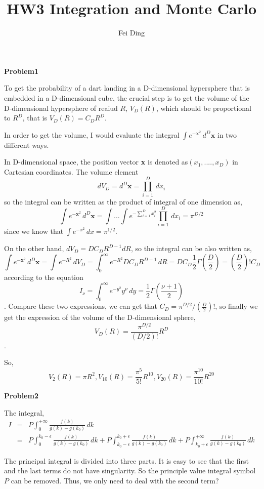\documentclass{article}
\title{HW3 Integration and Monte Carlo}
\author{Fei Ding}
\begin{document}
\maketitle

\textbf{Problem1}

To get the probability of a dart landing in a D-dimensional hypersphere that is embedded in a D-dimensional cube, the crucial step is to get the volume of the D-dimensional hypersphere of reaiud $R$, $V_D(R)$, which should be proportional to $R^D$, that is $V_D(R)=C_DR^D$. 

In order to get the volume, I would evaluate the integral $\int e^{-\textbf{x}^2}\,d^D\textbf{x}$ in two different ways.


In D-dimensional space, the position vector \textbf{x} is denoted as$(x_1,....,x_D)$ in Cartesian coordinates.  The volume element \[dV_D=d^D\textbf{x}=\prod_{i=1}^{D}\,dx_i\] so the integral can be written as the product of integral of one dimension as,
\[\int e^{-\textbf{x}^2}\,d^D\textbf{x}=\int\ldots\int e^{-\sum_{i=1}^{D}x_i^2}\prod_{i=1}^{D}\,dx_i=\pi^{D/2}\]
since we know that $\int e^{-x^2}\,dx=\pi^{1/2}$.

On the other hand, $dV_D=DC_DR^{D-1}dR$, so the integral can be also written as,
\[\int e^{-\textbf{x}^2}\,d^D\textbf{x}=\int e^{-R^2}\,dV_D=\int_{0}^{\infty}e^{-R^2}DC_DR^{D-1}\,dR=DC_D\frac{1}{2}\Gamma(\frac{D}{2})=(\frac{D}{2})!C_D\]
according to the equation \[I_\nu=\int_{0}^{\infty}e^{-y^2}y^\nu\,dy=\frac{1}{2}\Gamma(\frac{\nu+1}{2})\]. 
Compare these two expressions, we can get that $C_D=\pi^{D/2}/(\frac{D}{2})!$, so finally we get the expression of the volume of the D-dimensional sphere,
\[V_D(R)= \frac{\pi^{D/2}}{(D/2)!}R^D\].

So,
 \[V_2(R)=\pi R^2, V_{10}(R)= \frac{\pi^5}{5!}R^{10}, V_{20}(R)=\frac{\pi^{10}}{10!}R^{20}\]

\vskip 1cm

\textbf{Problem2}

The integral,
\begin{eqnarray*}
I&=&P\int_0^{+\infty}\frac{f(k)}{g(k)-g(k_0)}\,dk\\
&=&P\int_0^{k_0-\epsilon}\frac{f(k)}{g(k)-g(k_0)}\,dk+P\int_{k_0-\epsilon}^{k_0+\epsilon} \frac{f(k)}{g(k)-g(k_0)}\,dk+P\int_{k_0+\epsilon}^{+\infty}\frac{f(k)}{g(k)-g(k_0)}\,dk
\end{eqnarray*}

The principal integral is divided into three parts.  It is easy to see that the first and the last terms do not have singularity.  So the principle value integral symbol $P$ can be removed.  Thus, we only need to deal with the second term?  
\end{document}
